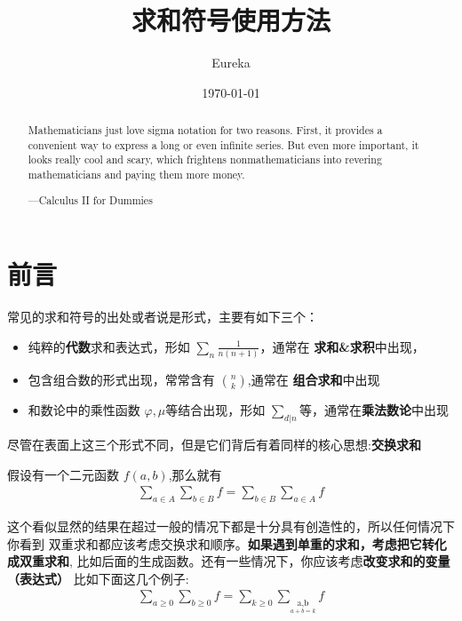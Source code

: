 \documentclass[12pt]{article}
\title{求和符号使用方法}
\author{Eureka}
\date{\today}
\begin{document}
\maketitle    

\begin{abstract}
    Mathematicians just love sigma notation for two reasons. First, it provides a convenient
way to express a long or even infinite series. But even more important, it looks really
cool and scary, which frightens nonmathematicians into revering mathematicians and
paying them more money.

\hfill ---Calculus II for Dummies
\end{abstract}


\tableofcontents
\clearpage


\section{前言}
常见的求和符号的出处或者说是形式，主要有如下三个：
\begin{itemize}
    \item 纯粹的{\bf 代数}求和表达式，形如 $\sum\limits_{n}{\frac{1}{n(n+1)}}$，通常在 \textbf{求和\&求积}中出现， 
    \item 包含组合数的形式出现，常常含有 $\binom{n}{k}$,通常在 {\bf 组合求和}中出现
    \item 和数论中的乘性函数 $\varphi, \mu$等结合出现，形如 $\sum\limits_{d|n}$等，通常在{\bf 乘法数论}中出现
\end{itemize}

尽管在表面上这三个形式不同，但是它们背后有着同样的核心思想:{\bf 交换求和}
\begin{framed}
    假设有一个二元函数 $f(a, b)$,那么就有
    \begin{align}
        \sum_{a\in A}^{}{\sum_{b\in B}^{}{f}} 
        = \sum_{b\in B}^{}{\sum_{a\in A}^{}{f}}
    \end{align} 
\end{framed}

这个看似显然的结果在超过一般的情况下都是十分具有创造性的，所以任何情况下你看到
双重求和都应该考虑交换求和顺序。{\bf 如果遇到单重的求和，考虑把它转化成双重求和},
比如后面的生成函数。还有一些情况下，你应该考虑{\bf 改变求和的变量（表达式）}
比如下面这几个例子:
\begin{align*}
    \sum_{a\ge 0}^{}{\sum_{b\ge 0}^{}{f}} 
    = \sum_{k\ge 0}^{}{\sum_{\mathop{a, b}\limits_{a+b=k}}^{}{f}}
\end{align*}
\end{document}
